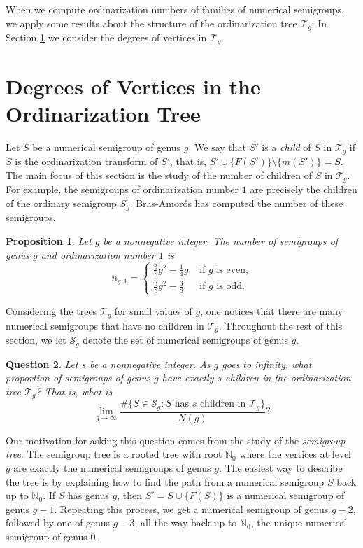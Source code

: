 \documentclass[12pt]{amsart}
\newcommand{\N}{{\mathbb N}}
\newcommand{\T}{{\mathcal T}}
\theoremstyle{plain}\newtheorem{proposition}{Proposition}[section]
\newtheorem{question}[proposition]{Question}
\newtheorem{prop}[proposition]{Proposition}
\begin{document}
When we compute ordinarization numbers of families of numerical semigroups, we apply some results about the structure of the ordinarization tree $\T_g$.  In Section \ref{sec:ord_tree} we consider the degrees of vertices in $\T_g$.

\section{Degrees of Vertices in the Ordinarization Tree}\label{sec:ord_tree}

Let $S$ be a numerical semigroup of genus $g$.  We say that $S'$ is a \emph{child} of $S$ in $\T_g$ if $S$ is the ordinarization transform of $S'$, that is, $S' \cup \{F(S')\} \setminus \{m(S')\} = S$.  The main focus of this section is the study of the number of children of $S$ in $\T_g$.  For example, the semigroups of ordinarization number $1$ are precisely the children of the ordinary semigroup $S_g$.  Bras-Amor\'os has computed the number of these semigroups.
\begin{prop}\cite[Lemma 8]{Bras-Amoros_ord}\label{Ord1}
Let $g$ be a nonnegative integer.  The number of semigroups of genus $g$ and ordinarization number $1$ is 
\[
n_{g,1} = 
\begin{cases}
\frac{3}{8} g^2 - \frac{1}{4} g & \text{ if } g \text{ is even,}\\
\frac{3}{8} g^2 - \frac{3}{8} & \text{ if } g \text{ is odd.}
\end{cases}
\]
\end{prop}

Considering the trees $\T_g$ for small values of $g$, one notices that there are many numerical semigroups that have no children in $\T_g$.  Throughout the rest of this section, we let $\mathcal{S}_g$ denote the set of numerical semigroups of genus $g$.
\begin{question}
Let $s$ be a nonnegative integer.  As $g$ goes to infinity, what proportion of semigroups of genus $g$ have exactly $s$ children in the ordinarization tree $\T_g$?  That is, what is
\[
\lim_{g\rightarrow \infty} \frac{\#\{S \in \mathcal{S}_g \colon S \text{ has } s \text{ children in } \T_g\}}{N(g)}? 
\]
\end{question}
Our motivation for asking this question comes from the study of the \emph{semigroup tree}.  The semigroup tree is a rooted tree with root $\N_0$ where the vertices at level $g$ are exactly the numerical semigroups of genus $g$.  The easiest way to describe the tree is by explaining how to find the path from a numerical semigroup $S$ back up to $\N_0$.  If $S$ has genus $g$, then $S' = S \cup \{F(S)\}$ is a numerical semigroup of genus $g-1$.  Repeating this process, we get a numerical semigroup of genus $g-2$, followed by one of genus $g-3$, all the way back up to $\N_0$, the unique numerical semigroup of genus $0$.  
\end{document}
